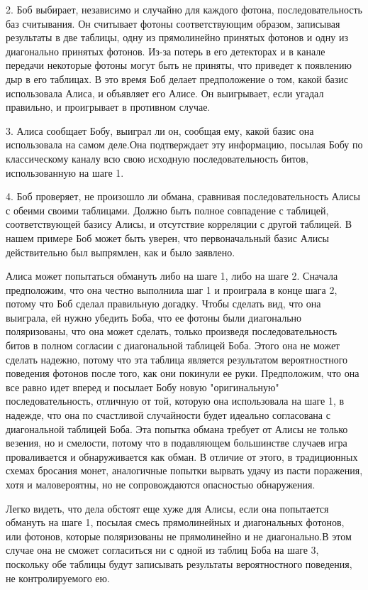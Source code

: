 2. Боб выбирает, независимо и случайно для каждого фотона, последовательность баз считывания. Он считывает фотоны соответствующим образом, записывая результаты в две таблицы, одну из прямолинейно принятых фотонов и одну из диагонально принятых фотонов. Из-за потерь в его детекторах и в канале передачи некоторые фотоны могут быть не приняты, что приведет к появлению дыр в его таблицах. В это время Боб делает предположение о том, какой базис использовала Алиса, и объявляет его Алисе. Он выигрывает, если угадал правильно, и проигрывает в противном случае.

­­3. Алиса сообщает Бобу, выиграл ли он, сообщая ему, какой базис она использовала на самом деле.Она подтверждает эту информацию, посылая Бобу по классическому каналу всю свою исходную последовательность битов, использованную на шаге 1.

4. Боб проверяет, не произошло ли обмана, сравнивая последовательность Алисы с обеими своими таблицами. Должно быть полное совпадение с таблицей, соответствующей базису Алисы, и отсутствие корреляции с другой таблицей. В нашем примере Боб может быть уверен, что первоначальный базис Алисы действительно был выпрямлен, как и было заявлено.

­Алиса может попытаться обмануть либо на шаге 1, либо на шаге 2. Сначала предположим, что она честно выполнила шаг 1 и проиграла в конце шага 2, потому что Боб сделал правильную догадку. Чтобы сделать вид, что она выиграла, ей нужно убедить Боба, что ее фотоны были диагонально поляризованы, что она может сделать, только произведя последовательность битов в полном согласии с диагональной таблицей Боба. Этого она не может сделать надежно, потому что эта таблица является результатом вероятностного поведения фотонов после того, как они покинули ее руки. Предположим, что она все равно идет вперед и посылает Бобу новую "оригинальную" последовательность, отличную от той, которую она использовала на шаге 1, в надежде, что она по счастливой случайности будет идеально согласована с диагональной таблицей Боба. Эта попытка обмана требует от Алисы не только везения, но и смелости, потому что в подавляющем большинстве случаев игра проваливается и обнаруживается как обман. В отличие от этого, в традиционных схемах бросания монет, аналогичные попытки вырвать удачу из пасти поражения, хотя и маловероятны, но не сопровождаются опасностью обнаружения.

­­­Легко видеть, что дела обстоят еще хуже для Алисы, если она попытается обмануть на шаге 1, посылая смесь прямолинейных и диагональных фотонов, или фотонов, которые поляризованы не прямолинейно и не диагонально.В этом случае она не сможет согласиться ни с одной из таблиц Боба на шаге 3, поскольку обе таблицы будут записывать результаты вероятностного поведения, не контролируемого ею.

